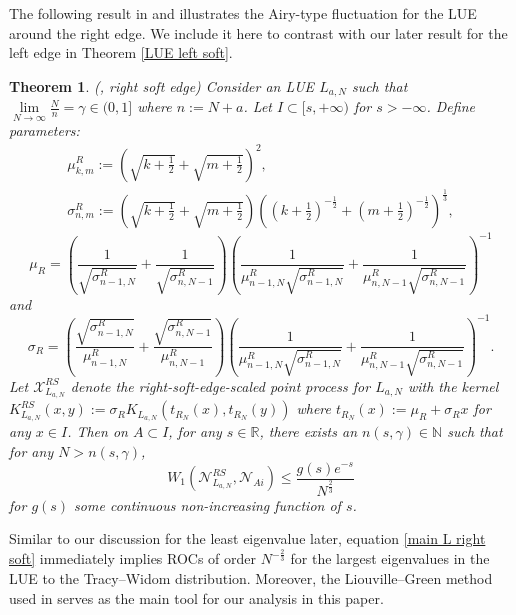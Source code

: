 \documentclass[11pt]{article}
\newtheorem{theorem}{Theorem}[section]
\numberwithin{equation}{section}%
\numberwithin{theorem}{section}
\begin{document}
The following result in \cite{cai2025mesoscopicratesconvergencehermitian} and \cite{el2006rate} illustrates the Airy-type fluctuation for the LUE around the right edge. We include it here to contrast with our later result for the left edge in Theorem \ref{LUE left soft}.
\begin{theorem}\label{LUE right soft}
   (\cite[Theorem $2.5$]{cai2025mesoscopicratesconvergencehermitian}, right soft edge) Consider an LUE $L_{a,N}$ such that $\lim\limits_{N\rightarrow\infty}\frac{N}{n}=\gamma\in(0,1]$ where $n:=N+a$. Let $I\subset[s,+\infty)$ for $s>-\infty$. Define parameters:
    \begin{equation*}
      \begin{array}{ll}
      \mu^R_{k,m}:=\left(\sqrt{k+\frac{1}{2}}+\sqrt{m+\frac{1}{2}}\right)^2,\\
      \sigma^R_{n,m}:=\left(\sqrt{k+\frac{1}{2}}+\sqrt{m+\frac{1}{2}}\right)\left(\left(k+\frac{1}{2}\right)^{-\frac{1}{2}}+\left(m+\frac{1}{2}\right)^{-\frac{1}{2}}\right)^{\frac{1}{3}},
      \end{array}
    \end{equation*}
\begin{equation*}
    \mu_R=\left(\frac{1}{\sqrt{\sigma_{n-1,N}^{R}}}+\frac{1}{\sqrt{\sigma_{n,N-1}^{R}}}\right)\left(\frac{1}{\mu^R_{n-1,N}\sqrt{\sigma_{n-1,N}^{R}}}+\frac{1}{\mu^R_{n,N-1}\sqrt{\sigma_{n,N-1}^{R}}}\right)^{-1}
\end{equation*}
and
\begin{equation*}
    \sigma_R=\left(\frac{\sqrt{\sigma_{n-1,N}^{R}}}{\mu^R_{n-1,N}}+\frac{\sqrt{\sigma_{n,N-1}^{R}}}{\mu^R_{n,N-1}}\right)\left(\frac{1}{\mu^R_{n-1,N}\sqrt{\sigma_{n-1,N}^{R}}}+\frac{1}{\mu^R_{n,N-1}\sqrt{\sigma_{n,N-1}^{R}}}\right)^{-1}.
\end{equation*}
Let $\mathcal{X}_{L_{a,N}}^{RS}$ denote the right-soft-edge-scaled point process for $L_{a,N}$ with the kernel $K_{L_{a,N}}^{RS}(x,y):=\sigma_{R}K_{L_{a,N}}(t_{R_{N}}(x),t_{R_{N}}(y))$ where $t_{R_N}(x):=\mu_{R}+\sigma_{R}x$ for any $x\in I$. Then on $A\subset I$, for any $s\in\mathbb{R}$, there exists an $n(s,\gamma)\in\mathbb{N}$ such that for any $N>n(s,\gamma)$,
\begin{equation}\label{main L right soft}
    W_1(\mathcal{N}_{L_{a,N}}^{RS},\mathcal{N}_{Ai})\le\frac{g(s)e^{-s}}{N^{\frac{2}{3}}}
\end{equation}
for $g(s)$ some continuous non-increasing function of $s$.
\end{theorem}
Similar to our discussion for the least eigenvalue later, equation \eqref{main L right soft} immediately implies ROCs of order $N^{-\frac{2}{3}}$ for the largest eigenvalues in the LUE to the Tracy--Widom distribution. Moreover, the Liouville--Green method used in \cite{el2006rate} serves as the main tool for our analysis in this paper.
\end{document}
